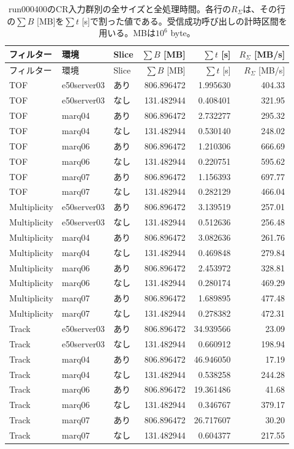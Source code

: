 \begin{longtable}{lllrrr}
 \caption{run000400のCR入力群別の全サイズと全処理時間。各行の$R_\Sigma$は、その行の$\sum B$ [MB]を$\sum t$ [s]で割った値である。受信成功呼び出しの計時区間を用いる。MBは$10^6$ byte。}\\
 \hline
 フィルター & 環境 & Slice & $\sum B$ [MB] & $\sum t$ [s] & $R_\Sigma$ [MB/s] \\ \hline
 \endfirsthead
 \hline
 フィルター & 環境 & Slice & $\sum B$ [MB] & $\sum t$ [s] & $R_\Sigma$ [MB/s] \\ \hline
 \endhead
 TOF & e50server03 & あり & 806.896472 & 1.995630 & 404.33 \\
 TOF & e50server03 & なし & 131.482944 & 0.408401 & 321.95 \\
 TOF & marq04 & あり & 806.896472 & 2.732277 & 295.32 \\
 TOF & marq04 & なし & 131.482944 & 0.530140 & 248.02 \\
 TOF & marq06 & あり & 806.896472 & 1.210306 & 666.69 \\
 TOF & marq06 & なし & 131.482944 & 0.220751 & 595.62 \\
 TOF & marq07 & あり & 806.896472 & 1.156393 & 697.77 \\
 TOF & marq07 & なし & 131.482944 & 0.282129 & 466.04 \\
 Multiplicity & e50server03 & あり & 806.896472 & 3.139519 & 257.01 \\
 Multiplicity & e50server03 & なし & 131.482944 & 0.512636 & 256.48 \\
 Multiplicity & marq04 & あり & 806.896472 & 3.082636 & 261.76 \\
 Multiplicity & marq04 & なし & 131.482944 & 0.469848 & 279.84 \\
 Multiplicity & marq06 & あり & 806.896472 & 2.453972 & 328.81 \\
 Multiplicity & marq06 & なし & 131.482944 & 0.280174 & 469.29 \\
 Multiplicity & marq07 & あり & 806.896472 & 1.689895 & 477.48 \\
 Multiplicity & marq07 & なし & 131.482944 & 0.278382 & 472.31 \\
 Track & e50server03 & あり & 806.896472 & 34.939566 & 23.09 \\
 Track & e50server03 & なし & 131.482944 & 0.660912 & 198.94 \\
 Track & marq04 & あり & 806.896472 & 46.946050 & 17.19 \\
 Track & marq04 & なし & 131.482944 & 0.538258 & 244.28 \\
 Track & marq06 & あり & 806.896472 & 19.361486 & 41.68 \\
 Track & marq06 & なし & 131.482944 & 0.346767 & 379.17 \\
 Track & marq07 & あり & 806.896472 & 26.717607 & 30.20 \\
 Track & marq07 & なし & 131.482944 & 0.604377 & 217.55 \\
 \hline
\end{longtable}
